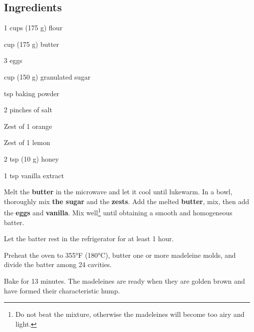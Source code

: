 \newpage
{}

\subsection*{Ingredients}
\begin{ingredients}
	\item 1 cups (175 g) flour
	\item {} cup (175 g) butter
	\item 3 eggs
	\item {} cup (150 g) granulated sugar
	\item {} tsp baking powder
	\item 2 pinches of salt
	\item Zest of 1 orange
	\item Zest of 1 lemon
	\item 2 tsp (10 g) honey
	\item 1 tsp vanilla extract
\end{ingredients}

\medskip

Melt the \textbf{butter} in the microwave and let it cool until lukewarm.
In a bowl, thoroughly mix \textbf{the sugar} and the \textbf{zests}.
Add the melted \textbf{butter}, mix, then add the \textbf{eggs} and \textbf{vanilla}.
Mix well\footnote{Do not beat the mixture, otherwise the madeleines will become too airy and light.} until obtaining a smooth and homogeneous batter.

Let the batter rest in the refrigerator for at least 1 hour.

Preheat the oven to 355°F (180°C), butter one or more madeleine molds, and divide the batter among 24 cavities.

Bake for 13 minutes.
The madeleines are ready when they are golden brown and have formed their characteristic hump.

\vspace*{0.75 cm}

\begin{recipeblock}
	\noindent 
\end{recipeblock}